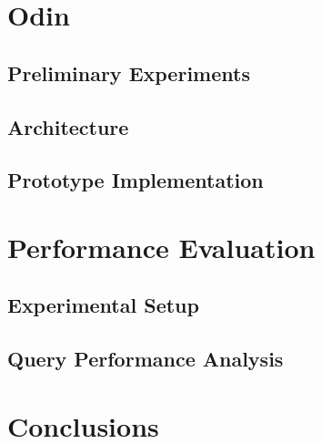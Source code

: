 \documentclass[12pt]{report}
\begin{document}
\chapter{Odin}

    

    \section{Preliminary Experiments}
    
        

    \section{Architecture}
    
        
    
    \section{Prototype Implementation}
    
        
        
\chapter{Performance Evaluation}

    
    
    \section{Experimental Setup}
    
        
    
    \section{Query Performance Analysis}
    
        

\chapter{Conclusions}

    

    
    
\end{document}
